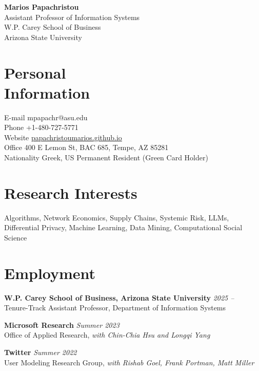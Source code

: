 \documentclass[margin]{res}
\newcommand{\field}[2]{\noindent \textbf{#1} \hfill #2 \\}
\begin{document}
\begin{center}
{\Large \textbf{Marios Papachristou}} \\ Assistant Professor of Information Systems \\ W.P. Carey School of Business \\ Arizona State University
\end{center}
\vspace{-1em}

\begin{resume}

\section{Personal \\ Information} 
E-mail \hfill mpapachr@asu.edu\\
Phone \hfill +1-480-727-5771 \\
Website \hfill \href{https://papachristoumarios.github.io}{{papachristoumarios.github.io}} \\
Office \hfill 400 E Lemon St, BAC 685, Tempe, AZ 85281 \\
Nationality \hfill Greek, US Permanent Resident (Green Card Holder)
  

\section{Research Interests} Algorithms, Network Economics, Supply Chains, Systemic Risk, LLMs, Differential Privacy, Machine Learning, Data Mining, Computational Social Science


\section{Employment}

\field{W.P. Carey School of Business, Arizona State University}{\emph{2025 --}}{Tenure-Track Assistant Professor, Department of Information Systems} 

\field{Microsoft Research}{\emph{Summer 2023}}{Office of Applied Research, \emph{with Chin-Chia Hsu and Longqi Yang}}

\field{Twitter}{\emph{Summer 2022}}{User Modeling Research Group, \emph{with Rishab Goel, Frank Portman, Matt Miller}}



\end{resume}
\end{document}

